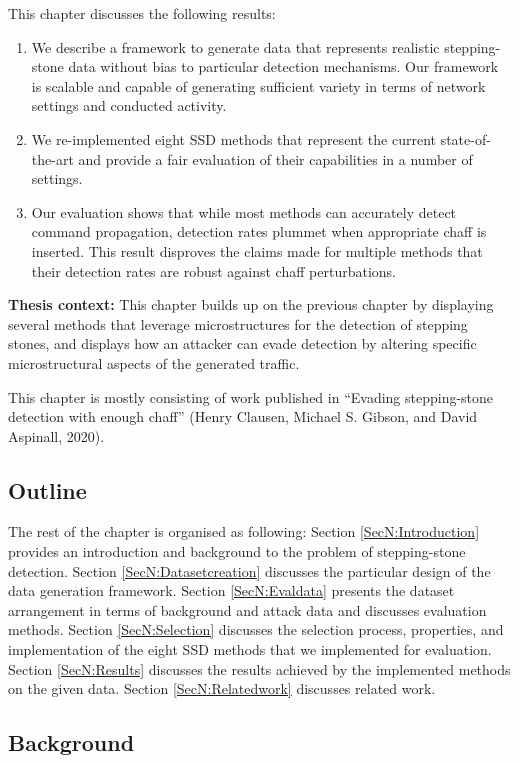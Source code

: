 This chapter discusses the following results:

\begin{enumerate}
\item We describe a framework to generate data that represents realistic stepping-stone data without bias to particular detection mechanisms. Our framework is scalable and capable of generating sufficient variety in terms of network settings and conducted activity. 
\item We re-implemented eight SSD methods that represent the current state-of-the-art and provide a fair evaluation of their capabilities in a number of settings. 
\item Our evaluation shows that while most methods can accurately detect command propagation, detection rates plummet when appropriate chaff is inserted. This result disproves the claims made for multiple methods that their detection rates are robust against chaff perturbations.
\end{enumerate} 


\textbf{Thesis context:} This chapter builds up on the previous chapter by displaying several methods that leverage microstructures for the detection of stepping stones, and displays how an attacker can evade detection by altering specific microstructural aspects of the generated traffic.

This chapter is mostly consisting of work published in ``Evading stepping-stone detection with enough chaff'' (Henry Clausen, Michael S. Gibson, and David Aspinall, 2020).

\subsection{Outline}
The rest of the chapter is organised as following: Section \ref{SecN:Introduction} provides an introduction and background to the problem of stepping-stone detection. Section \ref{SecN:Datasetcreation} discusses the particular design of the data generation framework.
Section \ref{SecN:Evaldata} presents the dataset arrangement in terms of background and attack data and discusses evaluation methods. Section \ref{SecN:Selection} discusses the selection process, properties, and implementation of the eight SSD methods that we implemented for evaluation. Section \ref{SecN:Results} discusses the results achieved by the implemented methods on the given data. Section \ref{SecN:Relatedwork} discusses related work.

\subsection{Background}


